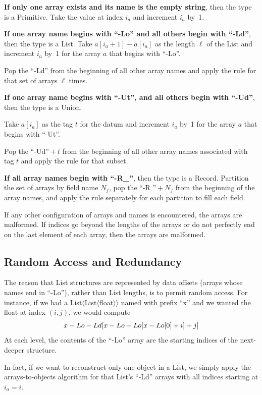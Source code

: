 \documentclass[10pt, conference, compsocconf]{IEEEtran}
\begin{document}
{\bf If only one array exists and its name is the empty string}, then the type is a Primitive. Take the value at index $i_a$ and increment $i_a$ by~1.

{\bf If one array name begins with ``-Lo'' and all others begin with ``-Ld''}, then the type is a List. Take $a[i_a + 1] - a[i_a]$ as the length $\ell$ of the List and increment $i_a$ by~1 for the array $a$ that begins with ``-Lo''.

Pop the ``-Ld'' from the beginning of all other array names and apply the rule for that set of arrays $\ell$ times.

{\bf If one array name begins with ``-Ut'', and all others begin with ``-Ud''}, then the type is a Union.

Take $a[i_a]$ as the tag $t$ for the datum and increment $i_a$ by~1 for the array $a$ that begins with ``-Ut''.

Pop the $\mbox{``-Ud''} + t$ from the beginning of all other array names associated with tag $t$ and apply the rule for that subset.

{\bf If all array names begin with ``-R\_''}, then the type is a Record. Partition the set of arrays by field name $N_f$, pop the $\mbox{``-R\_''} + N_f$ from the beginning of the array names, and apply the rule separately for each partition to fill each field.

If any other configuration of arrays and names is encountered, the arrays are malformed. If indices go beyond the lengths of the arrays or do not perfectly end on the last element of each array, then the arrays are malformed.

\subsection{Random Access and Redundancy}
\label{random-access-and-redundancy}

The reason that List structures are represented by data offsets (arrays whose names end in ``-Lo''), rather than List lengths, is to permit random access. For instance, if we had a List$\langle$List$\langle$float$\rangle\rangle$ named with prefix ``x'' and we wanted the float at index $(i, j)$, we would compute
\[ \mbox{x-Lo-Ld{\tt [}x-Lo-Lo{\tt [}x-Lo{\tt [}} 0 \mbox{\tt ]} + i \mbox{\tt ]} + j \mbox{\tt ]} \]
At each level, the contents of the ``-Lo'' array are the starting indices of the next-deeper structure.

In fact, if we want to reconstruct only one object in a List, we simply apply the arrays-to-objects algorithm for that List's ``-Ld'' arrays with all indices starting at $i_a = i$.
\end{document}
